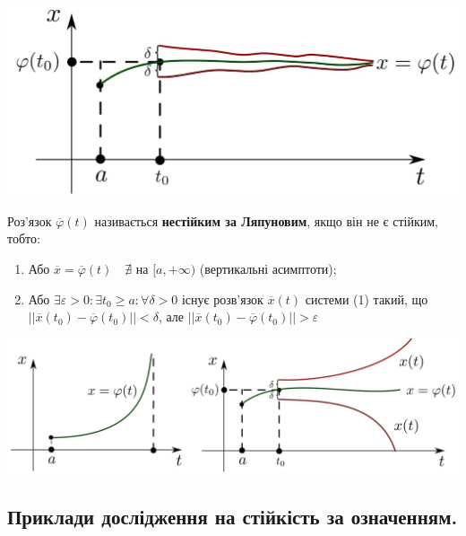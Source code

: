 \documentclass[14pt,a4paper]{scrartcl}
\theoremstyle{definition}
\theoremstyle{definition}
\theoremstyle{definition}
\begin{document}
\begin{center} \includegraphics[scale=0.35]{assets/lect2.jpg} \end{center}

Роз'язок $\overline{\varphi}(t)$ називається \textbf{нестійким за Ляпуновим}, якщо він не є стійким, тобто:
\ed

\begin{enumerate}
  \item Або $\overline{x} = \overline{\varphi}(t) \quad \nexists$ на  $[a, +\infty)$ (вертикальні асимптоти);
  \item Або $\exists \varepsilon > 0 : \exists t_0 \geq a :  \forall \delta > 0$ існує розв'язок $\overline{x}(t)$ системи (1) такий, що $||\overline{x}(t_0) - \overline{\varphi}(t_0)|| < \delta$, але $||\overline{x}(t_0) - \overline{\varphi}(t_0)|| > \varepsilon$
\end{enumerate}

\vfill
\begin{center} \includegraphics[scale=1.15]{assets/lect3+4.jpg} \end{center}
\vfill
\subsection{Приклади дослідження на стійкість за означенням.}
\end{document}
